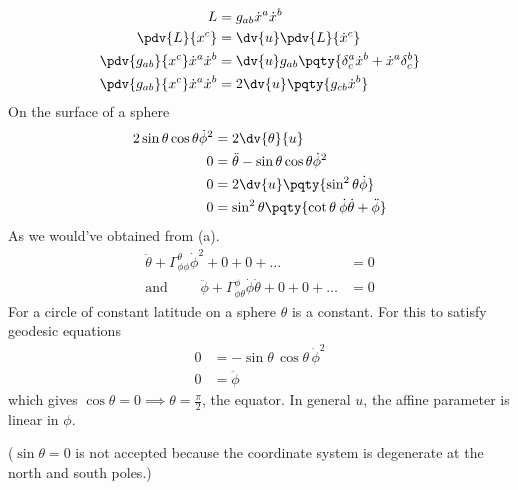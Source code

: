 \documentclass[12pt]{article}
\begin{document}
    \subsubsection{} { \begin{align*}
        L&=  g_{ab}\dot{x}^a \dot{x}^b\\
        \pdv{L}{x^c}& = \dv{u} \pdv{L}{\dot{x}^c}\\
        \pdv{g_{ab}}{x^c} \dot{x}^a \dot{x}^b & = \dv{u} g_{ab}\pqty{ \delta^a_c \dot{x}^b + \dot{x}^a \delta^b_c}\\
        \pdv{g_{ab}}{x^c} \dot{x}^a \dot{x}^b & = 2\dv{u}\pqty{ g_{cb}\dot{x}^b}
    \end{align*}}
    On the surface of a sphere
    \begin{align*}
        2\sin\theta \cos\theta \dot{\phi}^2 & = 2 \dv{\theta }{u}                                                       \\
        0                                   & =\ddot{\theta} -\sin\theta \cos\theta \dot{\phi}^2                        \\
        0                                   & = 2 \dv{u} \pqty{\sin^2\theta \dot{\phi}}\,                                \\
        0                                   & = \sin^2\theta \pqty{\cot \theta\: \dot{\phi} \dot{\theta} + \ddot{\phi}} \\
    \end{align*}
    As we would've obtained from (a).\begin{align*}
        \ddot{\theta} +\Gamma^{\theta }_{\phi \phi } \dot{\phi}^2 + 0 + 0 + \dots                         & =  0 \\
        \text{and }\qquad \ddot{\phi} +\Gamma^{\phi}_{\phi \theta }\dot{\phi}\dot{\theta} + 0 + 0 + \dots & = 0
    \end{align*}
    For a circle of constant latitude on a sphere \(\theta \) is a constant. For this to satisfy geodesic equations \begin{align*}
        0 & = - \sin\theta\, \cos\theta\, \dot{\phi}^2 \\
        0 & = \ddot{\phi}
    \end{align*}
    which gives \(\cos\theta = 0 \implies \theta = \frac{\pi}{2}\), the equator. In general \(u\), the affine parameter is linear in \(\phi \).

    (\(\sin \theta = 0\) is not accepted because the coordinate system is degenerate at the north and south poles.)
\end{document}
